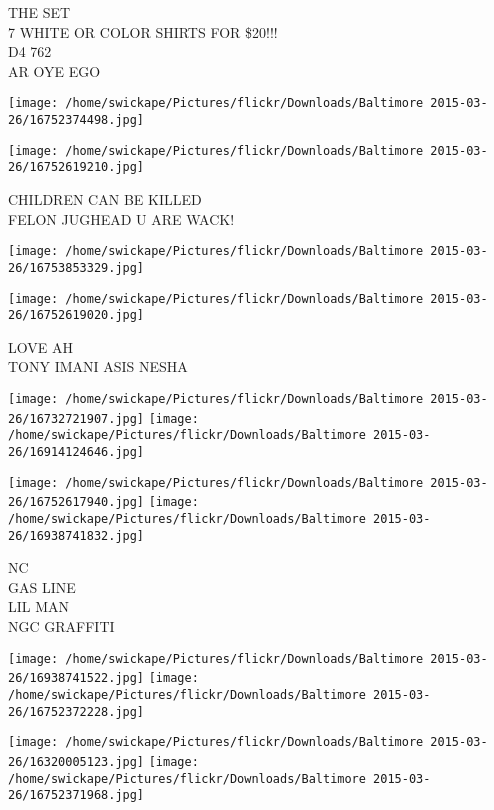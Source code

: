 \documentclass[10pt,letterpaper]{article}
\begin{document}
THE SET\\
7 WHITE OR COLOR SHIRTS FOR \$20!!!\\
D4 762\\
AR OYE EGO\\
\pagebreak

\texttt{[image: /home/swickape/Pictures/flickr/Downloads/Baltimore 2015-03-26/16752374498.jpg]}

\vspace{0.25in}
\texttt{[image: /home/swickape/Pictures/flickr/Downloads/Baltimore 2015-03-26/16752619210.jpg]}

CHILDREN CAN BE KILLED\\
FELON JUGHEAD U ARE WACK!\\
\pagebreak

\texttt{[image: /home/swickape/Pictures/flickr/Downloads/Baltimore 2015-03-26/16753853329.jpg]}

\vspace{0.25in}
\texttt{[image: /home/swickape/Pictures/flickr/Downloads/Baltimore 2015-03-26/16752619020.jpg]}

LOVE AH\\
TONY IMANI ASIS NESHA\\
\pagebreak

\texttt{[image: /home/swickape/Pictures/flickr/Downloads/Baltimore 2015-03-26/16732721907.jpg]}
\texttt{[image: /home/swickape/Pictures/flickr/Downloads/Baltimore 2015-03-26/16914124646.jpg]}

\texttt{[image: /home/swickape/Pictures/flickr/Downloads/Baltimore 2015-03-26/16752617940.jpg]}
\texttt{[image: /home/swickape/Pictures/flickr/Downloads/Baltimore 2015-03-26/16938741832.jpg]}

NC\\
GAS LINE\\
LIL MAN\\
NGC GRAFFITI\\
\pagebreak

\texttt{[image: /home/swickape/Pictures/flickr/Downloads/Baltimore 2015-03-26/16938741522.jpg]}
\texttt{[image: /home/swickape/Pictures/flickr/Downloads/Baltimore 2015-03-26/16752372228.jpg]}

\texttt{[image: /home/swickape/Pictures/flickr/Downloads/Baltimore 2015-03-26/16320005123.jpg]}
\texttt{[image: /home/swickape/Pictures/flickr/Downloads/Baltimore 2015-03-26/16752371968.jpg]}
\end{document}
